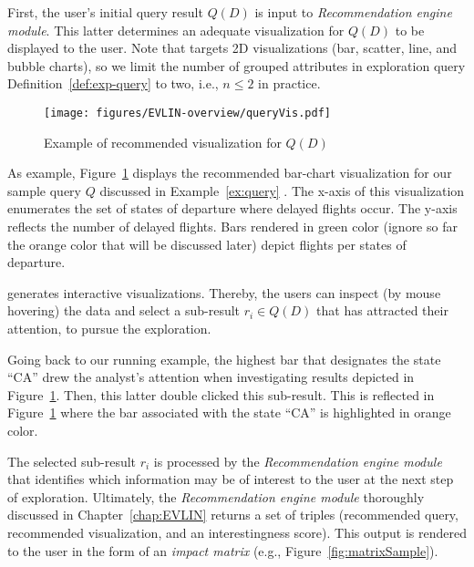 First, the user's initial query result $Q(D)$ is input to \emph{Recommendation engine module}. This latter determines an adequate visualization for $Q(D)$ to be displayed to the user. 
Note that \prototype{} targets 2D visualizations (bar, scatter, line, and bubble charts), so we limit the number of grouped attributes in exploration query Definition~\ref{def:exp-query} to two, i.e., $n \leq 2$ in practice. 

\begin{figure}[t]
\centering
\texttt{[image: figures/EVLIN-overview/queryVis.pdf]}
\caption{Example of recommended visualization for $Q(D)$}
\label{fig:Q}
\end{figure}


\begin{example}
\label{ex:VIS}
As example,  Figure~\ref{fig:Q} displays the recommended bar-chart visualization for our sample query $Q$ discussed in Example~\ref{ex:query} . 
The x-axis of this visualization enumerates the set of states of departure where delayed flights occur.  The y-axis reflects the number of delayed flights.  Bars rendered in green color (ignore so far the orange color that will be discussed later) depict flights per states of departure.
\end{example}



\prototype{} generates interactive visualizations. Thereby, the users can inspect (by mouse hovering) the data and select a sub-result $r_i \in Q(D)$ that has attracted their attention, to pursue the exploration.


\begin{example}
\label{ex:interaction}
\sloppy
Going back to our running example, the highest bar that designates the state ``CA'' drew the analyst's attention when investigating results depicted in Figure~\ref{fig:Q}. Then, this latter double clicked this sub-result. 
This is reflected in Figure~\ref{fig:Q} where the bar associated with the state ``CA''  is highlighted in orange color. 
\end{example}

The selected sub-result $r_i$ is processed by the \emph{Recommendation engine module} that identifies which information may be of interest to the user at the next step of exploration. 
Ultimately, the \emph{Recommendation engine module} thoroughly discussed in Chapter~\ref{chap:EVLIN}
returns a set of triples (recommended query, recommended visualization, and an interestingness score).
This output is rendered to the user in the form of an \emph{impact matrix} (e.g., Figure~\ref{fig:matrixSample}).  

